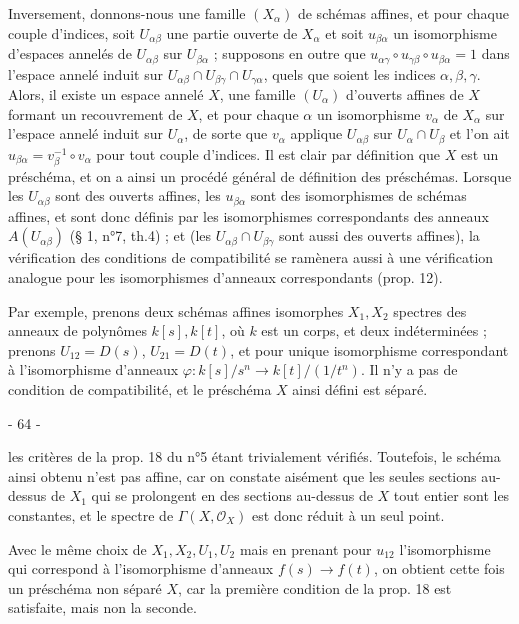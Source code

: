 Inversement, donnons-nous une famille $(X_\alpha)$ de schémas affines, et pour chaque couple d'indices, soit $U_{\alpha\beta}$ une partie ouverte de $X_\alpha$ et soit $u_{\beta\alpha}$ un isomorphisme d'espaces annelés de $U_{\alpha\beta}$ sur $U_{\beta\alpha}$ ; supposons en outre que $u_{\alpha\gamma} \circ u_{\gamma\beta} \circ u_{\beta\alpha} = 1$ dans l'espace annelé induit sur $U_{\alpha\beta} \cap U_{\beta\gamma} \cap U_{\gamma\alpha}$, quels que soient les indices $\alpha, \beta, \gamma$. Alors, il existe un espace annelé $X$, une famille $(U_\alpha)$ d'ouverts affines de $X$ formant un recouvrement de $X$, et pour chaque $\alpha$ un isomorphisme $v_\alpha$ de $X_\alpha$ sur l'espace annelé induit sur $U_\alpha$, de sorte que $v_\alpha$ applique $U_{\alpha\beta}$ sur $U_\alpha \cap U_\beta$ et l'on ait $u_{\beta\alpha} = v_\beta^{-1} \circ v_\alpha$ pour tout couple d'indices. Il est clair par définition que $X$ est un préschéma, et on a ainsi un procédé général de définition des préschémas. Lorsque les $U_{\alpha\beta}$ sont des ouverts affines, les $u_{\beta\alpha}$ sont des isomorphismes de schémas affines, et sont donc définis par les isomorphismes correspondants des anneaux $A(U_{\alpha\beta})$ (§ 1, n°7, th.4) ; et (les $U_{\alpha\beta} \cap U_{\beta\gamma}$ sont aussi des ouverts affines), la vérification des conditions de compatibilité se ramènera aussi à une vérification analogue pour les isomorphismes d'anneaux correspondants (prop. 12).

Par exemple, prenons deux schémas affines isomorphes $X_1, X_2$ spectres des anneaux de polynômes $k[s], k[t]$, où $k$ est un corps, et deux indéterminées ; prenons $U_{12} = D(s)$, $U_{21} = D(t)$, et pour unique isomorphisme correspondant à l'isomorphisme d'anneaux $\varphi : k[s]/s^n \to k[t]/(1/t^n)$. Il n'y a pas de condition de compatibilité, et le préschéma $X$ ainsi défini est séparé.

\newpage


- 64 -

les critères de la prop. 18 du n°5 étant trivialement vérifiés. Toutefois, le schéma ainsi obtenu n'est pas affine, car on constate aisément que les seules sections au-dessus de $X_1$ qui se prolongent en des sections au-dessus de $X$ tout entier sont les constantes, et le spectre de $\Gamma(X, \mathcal{O}_X)$ est donc réduit à un seul point.

Avec le même choix de $X_1, X_2, U_1, U_2$ mais en prenant pour $u_{12}$ l'isomorphisme qui correspond à l'isomorphisme d'anneaux $f(s) \to f(t)$, on obtient cette fois un préschéma non séparé $X$, car la première condition de la prop. 18 est satisfaite, mais non la seconde.

